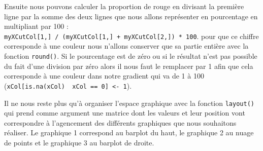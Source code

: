 \documentclass[]{book}
\theoremstyle{definition}
\theoremstyle{definition}
\theoremstyle{definition}
\theoremstyle{remark}
\begin{document}
Ensuite nous pouvons calculer la proportion de rouge en divisant la
première ligne par la somme des deux lignes que nous allons représenter
en pourcentage en multipliant par 100 :
\texttt{myXCutCol{[}1,{]}\ /\ (myXCutCol{[}1,{]}\ +\ myXCutCol{[}2,{]})\ *\ 100}.
pour que ce chiffre corresponde à une couleur nous n'allons conserver
que sa partie entière avec la fonction \texttt{round()}. Si le
pourcentage est de zéro ou si le résultat n'est pas possible du fait
d'une division par zéro alors il nous faut le remplacer par 1 afin que
cela corresponde à une couleur dans notre gradient qui va de 1 à 100
(\texttt{xCol{[}is.na(xCol)\ \textbar{}\ xCol\ ==\ 0{]}\ \textless{}-\ 1}).

Il ne nous reste plus qu'à organiser l'espace graphique avec la fonction
\texttt{layout()} qui prend comme argument une matrice dont les valeurs
et leur position vont correspondre à l'agencement des différents
graphiques que nous souhaitons réaliser. Le graphique 1 correspond au
barplot du haut, le graphique 2 au nuage de points et le graphique 3 au
barplot de droite.
\end{document}
